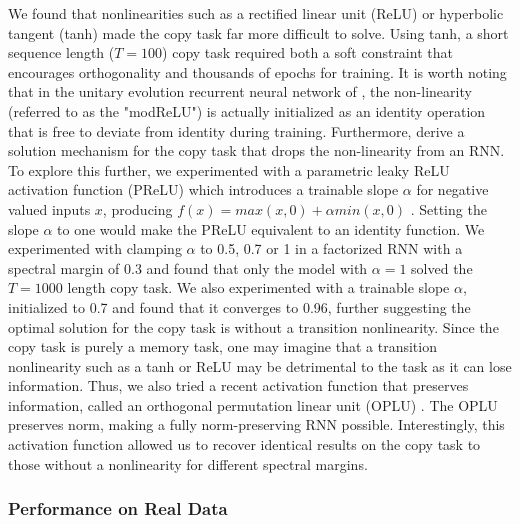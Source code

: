 \documentclass{article} %
\begin{document}
We found that nonlinearities such as a rectified linear unit (ReLU) \citep{nair2010rectified} or hyperbolic tangent (tanh) made the copy task far more difficult to solve. Using tanh, a short sequence length (${\mathit{T}=100}$) copy task required both a soft constraint that encourages orthogonality and thousands of epochs for training. It is worth noting that in the unitary evolution recurrent neural network of \citet{arjovsky2015unitary}, the non-linearity (referred to as the "modReLU") is actually initialized as an identity operation that is free to deviate from identity during training. Furthermore, \citet{henaff2016orthogonal} derive a solution mechanism for the copy task that drops the non-linearity from an RNN. To explore this further, we experimented with a parametric leaky ReLU activation function (PReLU) which introduces a trainable slope ${\mathit{\alpha}}$ for negative valued inputs ${\mathit{x}}$, producing ${\mathit{f}(\mathit{x})=max(\mathit{x}, 0) + \mathit{\alpha} min(\mathit{x}, 0)}$ \citep{he2015delving}. Setting the slope ${\mathit{\alpha}}$ to one would make the PReLU equivalent to an identity function. We experimented with clamping ${\mathit{\alpha}}$ to 0.5, 0.7 or 1 in a factorized RNN with a spectral margin of 0.3 and found that only the model with ${\mathit{\alpha}=1}$ solved the ${\mathit{T}=1000}$ length copy task. We also experimented with a trainable slope ${\mathit{\alpha}}$, initialized to 0.7 and found that it converges to 0.96, further suggesting the optimal solution for the copy task is without a transition nonlinearity. Since the copy task is purely a memory task, one may imagine that a transition nonlinearity such as a tanh or ReLU may be detrimental to the task as it can lose information. Thus, we also tried a recent activation function that preserves information, called an orthogonal permutation linear unit (OPLU) \citep{chernodub2016norm}. The OPLU preserves norm, making a fully norm-preserving RNN possible. Interestingly, this activation function allowed us to recover identical results on the copy task to those without a nonlinearity for different spectral margins.

\subsubsection{Performance on Real Data}
\label{sec:real_data}
\end{document}
